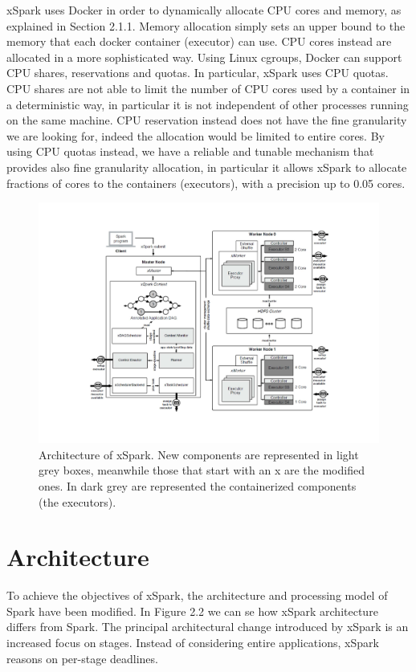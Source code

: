 xSpark uses Docker in order to dynamically allocate CPU cores and memory, as explained in Section 2.1.1. Memory allocation simply sets an upper bound to the memory that each docker container (executor) can use. CPU cores instead are allocated in a more sophisticated way.
Using Linux cgroups, Docker can support CPU shares, reservations and quotas. In particular, xSpark uses CPU quotas. CPU shares are not able to limit the number of CPU cores used by a container in a deterministic way, in particular it is not independent of other processes
running on the same machine. CPU reservation instead does not have the fine granularity we are looking for, indeed the allocation would be limited to entire cores. By using CPU quotas instead, we have a reliable and tunable mechanism that provides also fine granularity
allocation, in particular it allows xSpark to allocate fractions of cores
to the containers (executors), with a precision up to 0.05 cores.
\begin{figure}
	\centering
	\includegraphics[width=\columnwidth]{Images/xspark_architecture.pdf}  
	\caption[Architecture of xSpark.]{Architecture of xSpark. New components are represented in light grey boxes, meanwhile those that start with an x are the modified ones. In dark grey are represented the containerized components (the executors).}
	\label{fig:xSparkArchitecture}
\end{figure}
\section{Architecture}\label{sec:architecture}

To achieve the objectives of xSpark, the architecture and processing model of Spark have been modified. In Figure 2.2 we can se how xSpark architecture differs from Spark. The principal architectural change introduced by xSpark is an increased focus on stages. Instead of considering entire applications, xSpark reasons on per-stage deadlines. 

